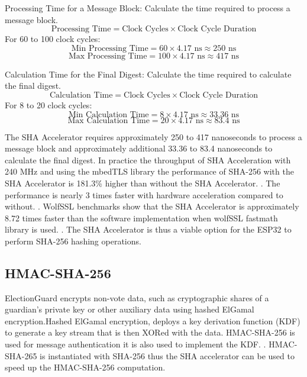 Processing Time for a Message Block: Calculate the time required to process a message block.
\begin{equation}
\text{Processing Time} = \text{Clock Cycles} \times \text{Clock Cycle Duration}
\end{equation}
For 60 to 100 clock cycles:
\begin{equation}
\text{Min Processing Time} = 60 \times 4.17 \text{ ns} \approx 250 \text{ ns}
\end{equation}
\begin{equation}
\text{Max Processing Time} = 100 \times 4.17 \text{ ns} \approx 417 \text{ ns}
\end{equation}

Calculation Time for the Final Digest: Calculate the time required to calculate the final digest.
\begin{equation}
\text{Calculation Time} = \text{Clock Cycles} \times \text{Clock Cycle Duration}
\end{equation}
For 8 to 20 clock cycles:
\begin{equation}
\text{Min Calculation Time} = 8 \times 4.17 \text{ ns} \approx 33.36 \text{ ns}
\end{equation}
\begin{equation}
\text{Max Calculation Time} = 20 \times 4.17 \text{ ns} \approx 83.4 \text{ ns}
\end{equation}

The SHA Accelerator requires approximately 250 to 417 nanoseconds to process a message block and approximately additional 33.36 to 83.4 nanoseconds to calculate the final digest. In practice the throughput of SHA Acceleration with 240 MHz and using the mbedTLS library the performance of SHA-256 with the SHA Accelerator is 181.3\% higher than without the SHA Accelerator. \cite[41]{eval-crypto}. The performance is nearly 3 times faster with hardware acceleration compared to without. \cite[41-42]{eval-crypto}. WolfSSL benchmarks show that the SHA Accelerator is approximately 8.72 times faster than the software implementation when wolfSSL fastmath library is used. \cite{wolfssl-benchmark}. The SHA Accelerator is thus a viable option for the ESP32 to perform SHA-256 hashing operations.

\subsection{HMAC-SHA-256}
ElectionGuard encrypts non-vote data, such as cryptographic shares of a guardian’s private key or other auxiliary data using hashed ElGamal encryption.Hashed ElGamal encryption, deploys a key derivation function (KDF) to generate a key stream that is then XORed with the data. HMAC-SHA-256 is used for message authentication it is also used to implement the KDF. \cite[7]{eg-spec}. HMAC-SHA-265 is instantiated with SHA-256 thus the SHA accelerator can be used to speed up the HMAC-SHA-256 computation.


